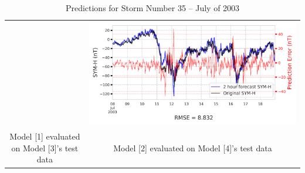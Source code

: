\documentclass[draft,sw]{agutexSI2019}
\begin{document}
\begin{table}
\begin{tabular}{cc}
&
\includegraphics[width=0.49\linewidth]{paper_plots/2h_swics_model_on_no_swics/2h_swics_model_on_no_swics_storm_35.png}
\\
Model [1] evaluated on Model [3]'s test data & Model [2] evaluated on Model [4]'s test data
\vspace*{12pt}
\\
\end{tabular}
\caption{Predictions for Storm Number 35 -- July of 2003}
\label{storm-35}
\end{table}
\end{document}
